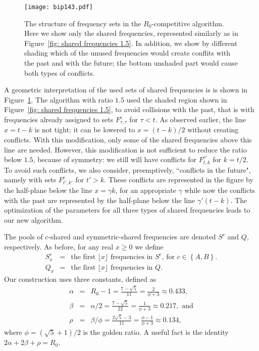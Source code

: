\documentclass[11pt]{article}
\newcommand{\braced}[1]{{ \left\{ #1 \right\} }}
\newcommand{\floor}[1]{{ \lfloor #1 \rfloor }}
\begin{document}
\begin{figure}[t]
\begin{center}
\texttt{[image: bip143.pdf]}

\caption{The structure of frequency sets in the $R_0$-competitive
algorithm. Here we show only the shared frequencies, represented
similarly as in Figure~\ref{fig: shared frequencies 1.5}. In addition,
we show by different shading which of the unused frequencies would
create conflits with the past and with the future; the bottom unshaded
part would cause both types of conflicts.}
\label{fig: shared frequencies 1.43}
\end{center}
\end{figure}

A geometric interpretation of the used sets of shared frequencies is
is shown in Figure~\ref{fig: shared frequencies 1.43}.  The algorithm
with ratio $1.5$ used the shaded region shown in Figure~\ref{fig:
shared frequencies 1.5}, to avoid collisions with the past, that is
with frequencies already assigned to sets $F^c_{\tau,\tau}$ for $\tau
< t$. As observed earlier, the line $x=t-k$ is not tight; it can be
lowered to $x=(t-k)/2$ without creating conflicts. With this
modification, only some of the shared frequencies above this line are
needed. However, this modification is not sufficient to reduce the
ratio below $1.5$, because of symmetry: we still will have conflicts
for $F^{c'}_{t,k}$ for $k = t/2$.  To avoid such conflicts, we also
consider, preemptively, ``conflicts in the future", namely with sets
$F^c_{t',k'}$ for $t' > k$. These conflicts are represented in the
figure by the half-plane below the line $x=\gamma k$, for an
appropriate $\gamma$ while now the conflicts with the past are
represented by the half-plane below the line $\gamma'(t-k)$. The
optimization of the parameters for all three types of shared
frequencies leads to our new algorithm.

\medskip

The pools of $c$-shared and symmetric-shared frequencies are denoted
$S^c$ and $Q$, respectively. As before, for any real $x\ge 0$ we define
\begin{eqnarray*}
	S^c_x &=& \textrm{the first $\floor{x}$ frequencies in $S^c$, for $c\in\braced{A,B}$}.
\\
	Q_x &=& \textrm{the first $\floor{x}$ frequencies in $Q$}.
\end{eqnarray*}
Our construction uses three constants, defined as
\begin{eqnarray*}
\alpha&=&R_0-1=\frac{7-\sqrt{5}}{11}=\frac{2}{\phi+3}\approx 0.433,
\\
\beta&=&\alpha/2=\frac{7-\sqrt{5}}{22}=\frac{1}{\phi+3}\approx 0.217,
\mbox{ and}
\\
\rho&=&\beta/\phi=\frac{2\sqrt{5}-3}{11}=\frac{\phi-1}{\phi+3}\approx 0.134,
\end{eqnarray*}
where $\phi=(\sqrt5+1)/2$ is the golden ratio.
A useful fact is the identity $2\alpha+2\beta+\rho=R_0$.
\end{document}
